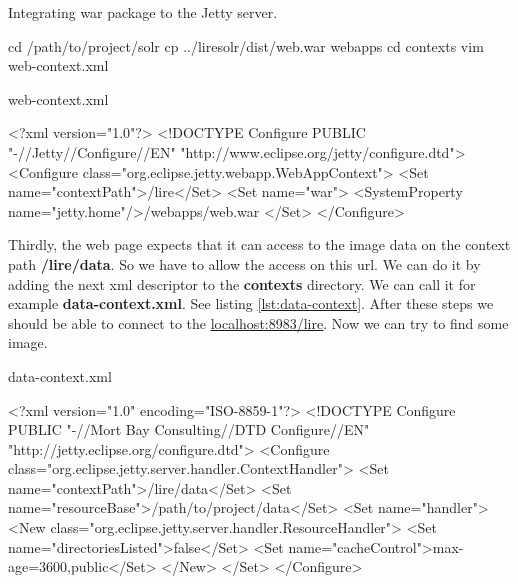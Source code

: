 \documentclass[12pt,a4paper]{report}
\begin{document}
\begin{listing}[H]
\caption{Integrating war package to the Jetty server.}
\begin{bashcode}
cd /path/to/project/solr
cp ../liresolr/dist/web.war webapps
cd contexts
vim web-context.xml
\end{bashcode}
\end{listing}

\begin{listing}[H]
\caption{web-context.xml}
\begin{xmlcode}
<?xml version="1.0"?>
<!DOCTYPE Configure PUBLIC "-//Jetty//Configure//EN"
"http://www.eclipse.org/jetty/configure.dtd">
<Configure class="org.eclipse.jetty.webapp.WebAppContext">
  <Set name="contextPath">/lire</Set>
  <Set name="war">
    <SystemProperty name="jetty.home"/>/webapps/web.war
  </Set>
</Configure>
\end{xmlcode}
\end{listing}

Thirdly, the web page expects that it can access to the image data on the context path \textbf{/lire/data}. So we have to allow the access on this url. We can do it by adding the next xml descriptor to the \textbf{contexts} directory. We can call it for example \textbf{data-context.xml}. See listing \ref{lst:data-context}. After these steps we should be able to connect to the \url{localhost:8983/lire}. Now we can try to find some image.

\begin{listing}[H]
\caption{data-context.xml}
\label{lst:data-context}
\begin{xmlcode}
<?xml version="1.0"  encoding="ISO-8859-1"?>
<!DOCTYPE Configure PUBLIC
"-//Mort Bay Consulting//DTD Configure//EN"
"http://jetty.eclipse.org/configure.dtd">
<Configure
class="org.eclipse.jetty.server.handler.ContextHandler">
 <Set name="contextPath">/lire/data</Set>
 <Set name="resourceBase">/path/to/project/data</Set>
 <Set name="handler">
  <New
  class="org.eclipse.jetty.server.handler.ResourceHandler">
   <Set name="directoriesListed">false</Set>
   <Set name="cacheControl">max-age=3600,public</Set>
  </New>
 </Set>
</Configure>
\end{xmlcode}
\end{listing}
\end{document}
